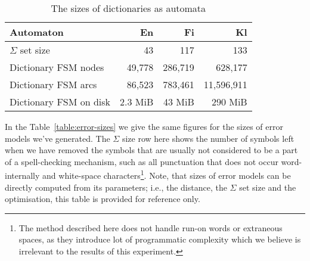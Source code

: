 \documentclass[11pt]{article}
\begin{document}
\begin{table}[h]
\begin{center}
\begin{scriptsize}
\begin{tabular}{|l|rrr|}
\hline
\bf Automaton & \bf En & \bf Fi & \bf Kl  \\ 
\hline
$\Sigma$ set size &
 43& 117& 133
\\
Dictionary FSM nodes &
 49,778& 286,719& 628,177
\\
Dictionary FSM arcs &
 86,523& 783,461& 11,596,911
\\
Dictionary FSM on disk & 
2.3 MiB &
43 MiB &
290 MiB
\\
\hline
\end{tabular}
\end{scriptsize}
\end{center}
\caption{\label{table:dictionary-sizes}
The sizes of dictionaries as automata}
\end{table}

In the Table~\ref{table:error-sizes} we give the same figures for the
sizes of error models we've generated. The $\Sigma$ size row here shows the
number of symbols left when we have removed the symbols that are usually not
considered to be a part of a spell-checking
mechanism, such as all punctuation that does not occur word-internally and
white-space characters\footnote{The method described here does not handle
run-on words or extraneous spaces, as they introduce lot of programmatic
complexity which we believe is irrelevant to the results of this experiment.}.
Note, that sizes of error models can be directly computed from its parameters;
i.e., the distance, the $\Sigma$ set size and the optimisation, this table
is provided for reference only.
\end{document}
